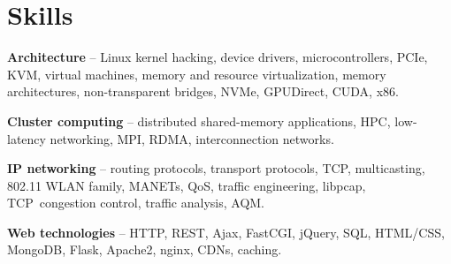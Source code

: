 
\section{Skills}
\begin{small}
	\parbox[t][][t]{\linewidth}{
		\textbf{Architecture} -- Linux kernel hacking, device drivers,
		microcontrollers,
		PCIe, KVM, virtual machines, memory and resource virtualization,
		memory architectures, non-transparent bridges, 
		NVMe, GPUDirect, CUDA, x86.
		\smallbreak
	}
	\parbox[t][][t]{\linewidth}{
		\textbf{Cluster computing} -- distributed shared-memory applications, HPC, low-latency
		networking, MPI, RDMA, interconnection networks.
		\smallbreak
	}
	\parbox[t][][t]{\linewidth}{
		\textbf{IP networking} -- routing protocols, transport protocols, TCP,
		multicasting, 802.11 WLAN family, MANETs, QoS, 
		traffic engineering, libpcap, TCP~congestion control, traffic
		analysis, AQM. 
		\smallbreak
	}
	\parbox[t][][t]{\linewidth}{
		\textbf{Web technologies} -- HTTP, REST, Ajax, FastCGI, jQuery, 
		SQL, HTML/CSS, MongoDB, Flask, Apache2, nginx, CDNs, caching.
	}
	\smallskip
\end{small}
